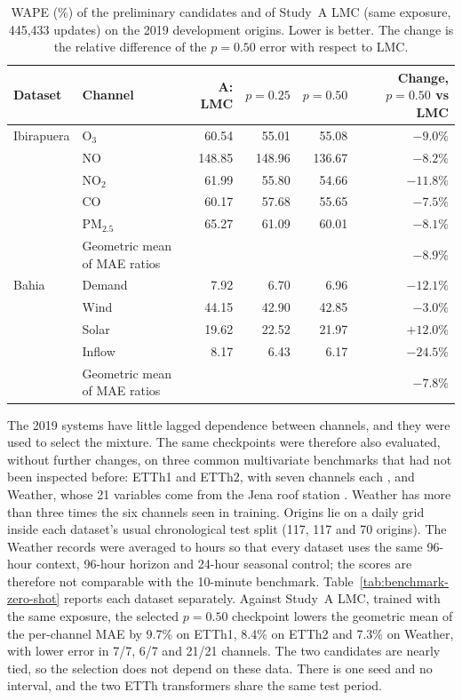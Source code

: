 \begin{table}[H]
\centering\small\setlength{\tabcolsep}{4pt}
\caption{WAPE (\%) of the preliminary candidates and of Study~A LMC (same
exposure, 445,433 updates) on the 2019 development origins. Lower is better.
The change is the relative difference of the $p=0.50$ error with respect to
LMC.}
\label{tab:preliminary-wape-vs-lmc}
\begin{tabular}{llrrrr}\toprule
Dataset & Channel & A: LMC & $p=0.25$ & $p=0.50$ & Change, $p=0.50$ vs LMC \\\midrule
Ibirapuera & O$_3$ & 60.54 & 55.01 & 55.08 & $-9.0\%$ \\
 & NO & 148.85 & 148.96 & 136.67 & $-8.2\%$ \\
 & NO$_2$ & 61.99 & 55.80 & 54.66 & $-11.8\%$ \\
 & CO & 60.17 & 57.68 & 55.65 & $-7.5\%$ \\
 & PM$_{2.5}$ & 65.27 & 61.09 & 60.01 & $-8.1\%$ \\
 & Geometric mean of MAE ratios & & & & $-8.9\%$ \\\midrule
Bahia & Demand & 7.92 & 6.70 & 6.96 & $-12.1\%$ \\
 & Wind & 44.15 & 42.90 & 42.85 & $-3.0\%$ \\
 & Solar & 19.62 & 22.52 & 21.97 & $+12.0\%$ \\
 & Inflow & 8.17 & 6.43 & 6.17 & $-24.5\%$ \\
 & Geometric mean of MAE ratios & & & & $-7.8\%$ \\\bottomrule
\end{tabular}
\end{table}

The 2019 systems have little lagged dependence between channels, and they
were used to select the mixture. The same checkpoints were therefore also
evaluated, without further changes, on three common multivariate benchmarks
that had not been inspected before: ETTh1 and ETTh2, with seven channels each
\citep{zhou2021informer}, and Weather, whose 21 variables come from the Jena
roof station \citep{wu2021autoformer,bgcjena2020weather}. Weather has more than
three times the six channels seen in training. Origins lie on a daily grid
inside each dataset's usual chronological test split (117, 117 and 70
origins). The Weather records were averaged to hours so that every dataset
uses the same 96-hour context, 96-hour horizon and 24-hour seasonal control;
the scores are therefore not comparable with the 10-minute benchmark.
Table~\ref{tab:benchmark-zero-shot} reports each dataset separately. Against
Study~A LMC, trained with the same exposure, the selected $p=0.50$ checkpoint
lowers the geometric mean of the per-channel MAE by 9.7\% on ETTh1, 8.4\% on
ETTh2 and 7.3\% on Weather, with lower error in 7/7, 6/7 and 21/21 channels.
The two candidates are nearly tied, so the selection does not depend on these
data. There is one seed and no interval, and the two ETTh transformers share
the same test period.

